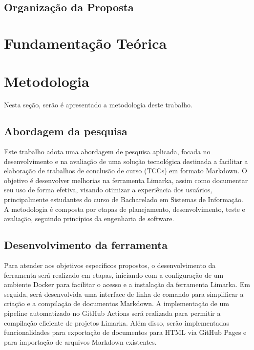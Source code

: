 \documentclass[
	12pt,				%
	oneside,			%
	a4paper,			%
	english,			%
	french,				%
	spanish,			%
	brazil				%
	]{abntex2}
\begin{document}
\hypertarget{organizauxe7uxe3o-da-proposta}{%
\section{Organização da Proposta}\label{organizauxe7uxe3o-da-proposta}}

\hypertarget{fundamentauxe7uxe3o-teuxf3rica}{%
\chapter{Fundamentação Teórica}\label{fundamentauxe7uxe3o-teuxf3rica}}

\hypertarget{metodologia}{%
\chapter{Metodologia}\label{metodologia}}

Nesta seção, serão é apresentado a metodologia deste trabalho.

\hypertarget{abordagem-da-pesquisa}{%
\section{Abordagem da pesquisa}\label{abordagem-da-pesquisa}}

Este trabalho adota uma abordagem de pesquisa aplicada, focada no
desenvolvimento e na avaliação de uma solução tecnológica destinada a
facilitar a elaboração de trabalhos de conclusão de curso (TCCs) em
formato Markdown. O objetivo é desenvolver melhorias na ferramenta
Limarka, assim como documentar seu uso de forma efetiva, visando
otimizar a experiência dos usuários, principalmente estudantes do curso
de Bacharelado em Sistemas de Informação. A metodologia é composta por
etapas de planejamento, desenvolvimento, teste e avaliação, seguindo
princípios da engenharia de software.

\hypertarget{desenvolvimento-da-ferramenta}{%
\section{Desenvolvimento da
ferramenta}\label{desenvolvimento-da-ferramenta}}

Para atender aos objetivos específicos propostos, o desenvolvimento da
ferramenta será realizado em etapas, iniciando com a configuração de um
ambiente Docker para facilitar o acesso e a instalação da ferramenta
Limarka. Em seguida, será desenvolvida uma interface de linha de comando
para simplificar a criação e a compilação de documentos Markdown. A
implementação de um pipeline automatizado no GitHub Actions será
realizada para permitir a compilação eficiente de projetos Limarka. Além
disso, serão implementadas funcionalidades para exportação de documentos
para HTML via GitHub Pages e para importação de arquivos Markdown
existentes.
\end{document}
